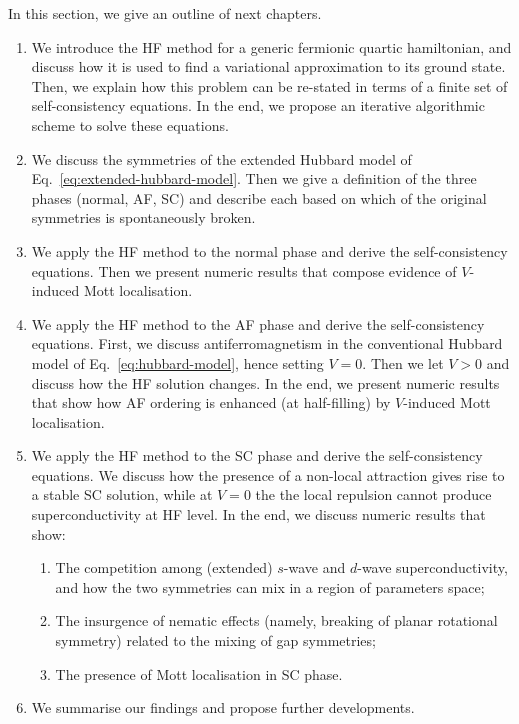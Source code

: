In this section, we give an outline of next chapters.
\begin{enumerate}[align=left]
	\item[Chap.~\ref{chap:hf}] We introduce the HF method for a generic fermionic quartic hamiltonian, and discuss how it is used to find a variational approximation to its ground state. Then, we explain how this problem can be re-stated in terms of a finite set of self-consistency equations. In the end, we propose an iterative algorithmic scheme to solve these equations.
	\item[Chap.~\ref{chap:ehm-symmetries}] We discuss the symmetries of the extended Hubbard model of Eq.~\eqref{eq:extended-hubbard-model}. Then we give a definition of the three phases (normal, AF, SC) and describe each based on which of the original symmetries is spontaneously broken.
	\item[Chap.~\ref{chap:normal}] We apply the HF method to the normal phase and derive the self-consistency equations. Then we present numeric results that compose evidence of $V$-induced Mott localisation.
	\item[Chap.~\ref{chap:af}] We apply the HF method to the AF phase and derive the self-consistency equations. First, we discuss antiferromagnetism in the conventional Hubbard model of Eq.~\eqref{eq:hubbard-model}, hence setting $V=0$. Then we let $V>0$ and discuss how the HF solution changes. In the end, we present numeric results that show how AF ordering is enhanced (at half-filling) by $V$-induced Mott localisation.
	\item[Chap.~\ref{chap:sc}] We apply the HF method to the SC phase and derive the self-consistency equations. We discuss how the presence of a non-local attraction gives rise to a stable SC solution, while at $V=0$ the the local repulsion cannot produce superconductivity at HF level. In the end, we discuss numeric results that show:
	\begin{enumerate}
		\item The competition among (extended) $s$-wave and $d$-wave superconductivity, and how the two symmetries can mix in a region of parameters space;
		\item The insurgence of nematic effects (namely, breaking of planar rotational symmetry) related to the mixing of gap symmetries;
		\item The presence of Mott localisation in SC phase.
	\end{enumerate}
	\item[Chap.~\ref{chap:conclusions}] We summarise our findings and propose further developments.
\end{enumerate}
